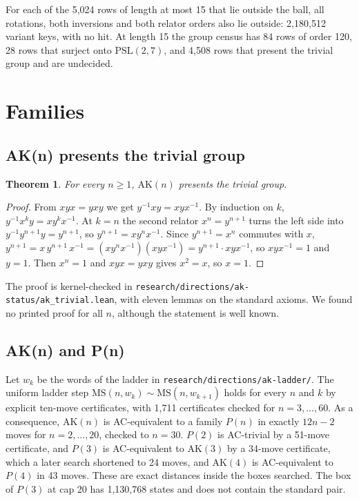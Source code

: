 \documentclass[11pt,a4paper]{article}
\newtheorem{theorem}{Theorem}[section]
\theoremstyle{definition}
\newcommand{\AK}{\mathrm{AK}}
\newcommand{\MS}{\mathrm{MS}}
\newcommand{\inv}[1]{#1^{-1}}
\begin{document}
For each of the 5,024 rows of length at most 15 that lie outside the ball, all rotations, both inversions and both relator orders also lie outside: 2,180,512 variant keys, with no hit. At length 15 the group census has 84 rows of order 120, 28 rows that surject onto $\mathrm{PSL}(2,7)$, and 4,508 rows that present the trivial group and are undecided.

\section{Families}\label{sec:families}

\subsection{AK(n) presents the trivial group}

\begin{theorem}\label{thm:aktriv}
For every $n\ge 1$, $\AK(n)$ presents the trivial group.
\end{theorem}

\begin{proof}
From $xyx=yxy$ we get $\inv{y}xy = xy\inv{x}$. By induction on $k$, $\inv{y}x^ky = xy^k\inv{x}$. At $k=n$ the second relator $x^n=y^{n+1}$ turns the left side into $\inv{y}y^{n+1}y=y^{n+1}$, so $y^{n+1}=xy^n\inv{x}$. Since $y^{n+1}=x^n$ commutes with $x$, $y^{n+1}=x\,y^{n+1}\,\inv{x}=(xy^n\inv{x})(xy\inv{x})=y^{n+1}\cdot xy\inv{x}$, so $xy\inv{x}=1$ and $y=1$. Then $x^n=1$ and $xyx=yxy$ gives $x^2=x$, so $x=1$.
\end{proof}

The proof is kernel-checked in \texttt{research/directions/ak-status/ak\_trivial.lean}, with eleven lemmas on the standard axioms. We found no printed proof for all $n$, although the statement is well known.

\subsection{AK(n) and P(n)}

Let $w_k$ be the words of the ladder in \texttt{research/directions/ak-ladder/}. The uniform ladder step $\MS(n,w_k)\sim\MS(n,w_{k+1})$ holds for every $n$ and $k$ by explicit ten-move certificates, with 1,711 certificates checked for $n=3,\dots,60$. As a consequence, $\AK(n)$ is AC-equivalent to a family $P(n)$ in exactly $12n-2$ moves for $n=2,\dots,20$, checked to $n=30$. $P(2)$ is AC-trivial by a 51-move certificate, and $P(3)$ is AC-equivalent to $\AK(3)$ by a 34-move certificate, which a later search shortened to 24 moves, and $\AK(4)$ is AC-equivalent to $P(4)$ in 43 moves. These are exact distances inside the boxes searched. The box of $P(3)$ at cap 20 has 1,130,768 states and does not contain the standard pair.
\end{document}
